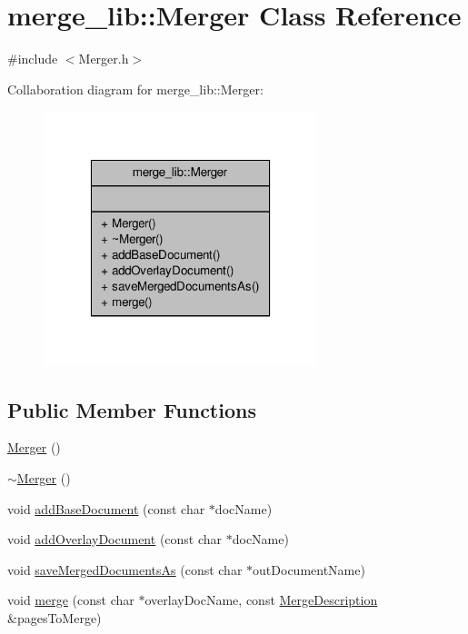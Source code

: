 \hypertarget{classmerge__lib_1_1_merger}{\section{merge\-\_\-lib\-:\-:Merger Class Reference}
\label{d8/d35/classmerge__lib_1_1_merger}
}


{\ttfamily \#include $<$Merger.\-h$>$}



Collaboration diagram for merge\-\_\-lib\-:\-:Merger\-:
\nopagebreak
\begin{figure}[H]
\begin{center}
\leavevmode
\includegraphics[width=226pt]{d9/df7/classmerge__lib_1_1_merger__coll__graph}
\end{center}
\end{figure}
\subsection*{Public Member Functions}
\begin{DoxyCompactItemize}
\item 
\hyperlink{classmerge__lib_1_1_merger_aa778178338ad58684ad6bd19d26f6ba9}{Merger} ()
\item 
\hyperlink{classmerge__lib_1_1_merger_a0415441f66540be69a9c31e71a6f6348}{$\sim$\-Merger} ()
\item 
void \hyperlink{classmerge__lib_1_1_merger_a21ec448078eb91834db284b038c0301c}{add\-Base\-Document} (const char $\ast$doc\-Name)
\item 
void \hyperlink{classmerge__lib_1_1_merger_ad2fe21c9daf3749cc1a7340146f8442a}{add\-Overlay\-Document} (const char $\ast$doc\-Name)
\item 
void \hyperlink{classmerge__lib_1_1_merger_ac76384e07224912ee9c816bc2d89d6f9}{save\-Merged\-Documents\-As} (const char $\ast$out\-Document\-Name)
\item 
void \hyperlink{classmerge__lib_1_1_merger_a02c1f126ae84b8c2f00ed7adf411124a}{merge} (const char $\ast$overlay\-Doc\-Name, const \hyperlink{namespacemerge__lib_a0a9efd2f197f07a92f4879b230a2e0b2}{Merge\-Description} \&pages\-To\-Merge)
\end{DoxyCompactItemize}


